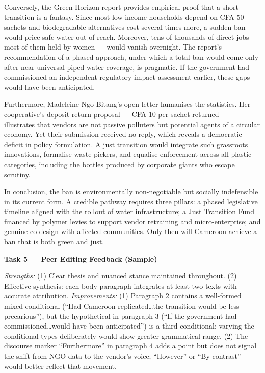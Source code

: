 \documentclass[11pt]{article}
\begin{document}
Conversely, the Green Horizon report provides empirical proof that a short transition is a fantasy. Since most low-income households depend on CFA 50 sachets and biodegradable alternatives cost several times more, a sudden ban would price safe water out of reach. Moreover, tens of thousands of direct jobs --- most of them held by women --- would vanish overnight. The report's recommendation of a phased approach, under which a total ban would come only after near-universal piped-water coverage, is pragmatic. If the government had commissioned an independent regulatory impact assessment earlier, these gaps would have been anticipated.

Furthermore, Madeleine Ngo Bitang's open letter humanises the statistics. Her cooperative's deposit-return proposal --- CFA 10 per sachet returned --- illustrates that vendors are not passive polluters but potential agents of a circular economy. Yet their submission received no reply, which reveals a democratic deficit in policy formulation. A just transition would integrate such grassroots innovations, formalise waste pickers, and equalise enforcement across all plastic categories, including the bottles produced by corporate giants who escape scrutiny.

In conclusion, the ban is environmentally non-negotiable but socially indefensible in its current form. A credible pathway requires three pillars: a phased legislative timeline aligned with the rollout of water infrastructure; a Just Transition Fund financed by polymer levies to support vendor retraining and micro-enterprise; and genuine co-design with affected communities. Only then will Cameroon achieve a ban that is both green and just.

\textbf{Task 5 --- Peer Editing Feedback (Sample)}

\textit{Strengths:} (1) Clear thesis and nuanced stance maintained throughout. (2) Effective synthesis: each body paragraph integrates at least two texts with accurate attribution. \textit{Improvements:} (1) Paragraph 2 contains a well-formed mixed conditional (``Had Cameroon replicated\ldots the transition would be less precarious''), but the hypothetical in paragraph 3 (``If the government had commissioned\ldots would have been anticipated'') is a third conditional; varying the conditional types deliberately would show greater grammatical range. (2) The discourse marker ``Furthermore'' in paragraph 4 adds a point but does not signal the shift from NGO data to the vendor's voice; ``However'' or ``By contrast'' would better reflect that movement.
\end{document}
